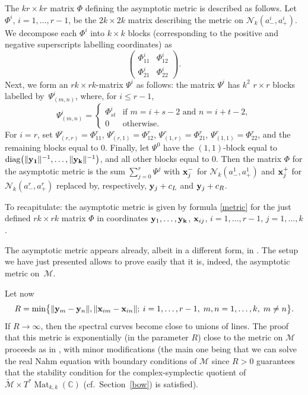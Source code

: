 \documentclass[pdftex]{sigma}
\newcommand{\cx}{{\mathbb C}}
\newcommand{\diag}{\operatorname{diag}}
\newcommand{\Mat}{\operatorname{Mat}}
\numberwithin{equation}{section}
\newcommand{\sM}{{\mathcal{M}}} %
\newcommand{\sN}{{\mathcal{N}}}
\begin{document}
{ The $kr\times kr$ matrix $\Phi$ defining the asymptotic metric is described as follows. Let $\Phi^i$, $i=1,\dots,r-1$, be the $2k\times 2k$ matrix describing the metric on $\sN_k(a_-^{i},a_+^{i})$. We decompose each $\Phi^i$ into $k\times k$ blocks (corresponding to the positive and negative superscripts labelling coordinates) as
\[
\begin{pmatrix} \Phi_{11}^i & \Phi^i_{12}\\
 \Phi_{21}^i & \Phi^i_{22}\end{pmatrix}.
 \]
Next, we form an $rk\times rk$-matrix $\Psi^i$ as follows: the matrix $\Psi^i$ has $k^2$ $r\times
 r$ blocks labelled by~$\Psi^i_{(m,n)}$, where, for $i\leq r-1$,
\[
\Psi^i_{(m,n)}=\begin{cases} \Phi_{st}^i & \text{if $m=i+s-2$ and $n=i+t-2$},\\
0& \text{otherwise}.\end{cases}
\]
 For $i=r$, set $\Psi^r_{(r,r)}=\Phi^r_{11}$, $\Psi^r_{(r,1)}=\Phi^r_{12}$, $\Psi^r_{(1,r)}=\Phi_{21}^r$, $\Psi^r_{(1,1)}=\Phi_{22}^r$, and the remaining blocks equal to $0$. Finally, let $\Psi^0$ have the $(1,1)$-block equal to $\diag\bigl(\|{\bf y_1}\|^{-1},\dots, \|{\bf y_k}\|^{-1}\bigr)$, and all other blocks equal to $0$. Then the matrix $\Phi$ for the asymptotic metric is the sum $\sum_{j=0}^r \Psi^j$ with ${\bf x}_j^-$ for $\sN_k(a_-^{1},a_+^1)$ and ${\bf x}_j^+$ for $\sN_k(a_-^{r},a_+^r)$ replaced by, respectively, ${\bf y}_j+c_L$ and ${\bf y}_j+c_R$.

 To recapitulate: the asymptotic metric is given by formula \eqref{metric} for the just defined $rk\times rk$ matrix $\Phi$ in coordinates ${\bf y}_1,\dots,{\bf y_k}$, ${\bf x}_{ij}$, $i=1,\dots, r-1$, $j=1,\dots,k$.
\begin{Remark} The asymptotic metric appears already, albeit in a different form, in \cite[Section~9]{Che2}. The setup we have just presented allows to prove easily that it is, indeed, the asymptotic metric on~$\sM$.
\end{Remark}

 Let now
 \[
 R=\min\bigl\{\|{\bf y}_m-{\bf y}_n\|,\|{\bf x}_{im}-{\bf x}_{in}\|;\: i=1,\dots,r-1,\; m,n=1,\dots,k,\; m\neq n\bigr\}.
 \]
 If $R\to \infty$, then the spectral curves become close to unions of lines.
 The proof that this metric is exponentially (in the parameter $R$) close to the metric on $\sM$ proceeds as in \cite[Theorem~9.1]{BSU}, with minor modifications (the main one being that we can solve the real Nahm equation with boundary conditions of $\sM$ since $R>0$ guarantees that the stability condition for the complex-symplectic quotient of $\tilde\sM\times T^\ast \Mat_{k,k}(\cx)$ (cf.\ Section~\ref{bow}) is satisfied).

}
\end{document}
